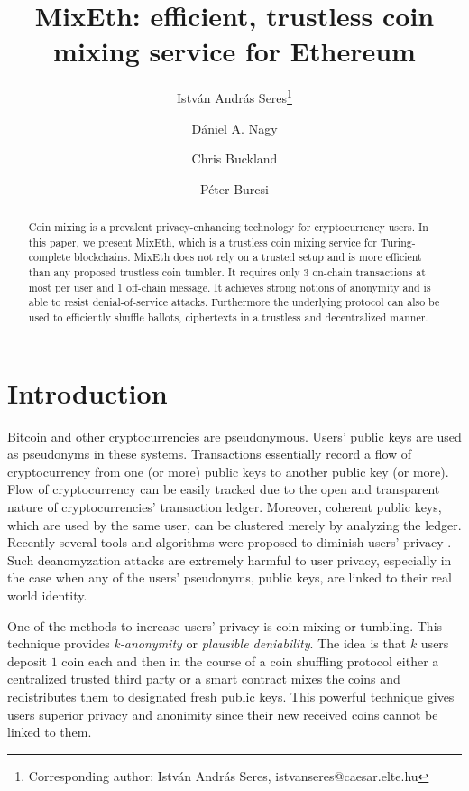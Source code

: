 \documentclass[a4paper,UKenglish,cleveref, autoref]{oasics-v2019}
\date{}
\title{MixEth: efficient, trustless coin mixing service for Ethereum} %
\author{István András Seres\footnote{Corresponding author: István András Seres, istvanseres@caesar.elte.hu}}{Eötvös Loránd University, Hungary \and \url{http://istvanseres.web.elte.hu/} }{istvanseres@caesar.elte.hu}{https://orcid.org/0000-0003-0143-4057}{}%
\author{Dániel A. Nagy}{Eötvös Loránd University, Hungary}{daniel@ethereum.org}{}{}
\author{Chris Buckland}{King's College London, United Kingdom}{cpbuckland88@gmail.com}{}{is supported by an Ethereum Foundation scaling grant and an Ethereum Community Fund grant.}
\author{Péter Burcsi}{Eötvös Loránd University, Hungary}{bupe@inf.elte.hu}{https://orcid.org/0000-0003-3306-6500}{}
\begin{document}
\maketitle

\begin{abstract}
Coin mixing is a prevalent privacy-enhancing technology for cryptocurrency users. In this paper, we present MixEth, which is a trustless coin mixing service for Turing-complete blockchains. MixEth does not rely on a trusted setup and is more efficient than any proposed trustless coin tumbler. It requires only 3 on-chain transactions at most per user and 1 off-chain message. It achieves strong notions of anonymity and is able to resist denial-of-service attacks. Furthermore the underlying protocol can also be used to efficiently shuffle ballots, ciphertexts in a trustless and decentralized manner. 
\end{abstract}

\section{Introduction}
Bitcoin \cite{nakamoto2008bitcoin} and other cryptocurrencies are pseudonymous. Users' public keys are used as pseudonyms in these systems. Transactions essentially record a flow of cryptocurrency from one (or more) public keys to another public key (or more). Flow of cryptocurrency can be easily tracked due to the open and transparent nature of cryptocurrencies' transaction ledger. Moreover, coherent public keys, which are used by the same user, can be clustered merely by analyzing the ledger. Recently several tools and algorithms were proposed to diminish users' privacy \cite{meiklejohn2013fistful,moser2013inquiry,moreno2016listening}. Such deanomyzation attacks are extremely harmful to user privacy, especially in the case when any of the users' pseudonyms, public keys, are linked to their real world identity.

One of the methods to increase users' privacy is coin mixing or tumbling. This technique provides \textit{k-anonymity} or \textit{plausible deniability}. The idea is that $k$ users deposit $1$ coin each and then in the course of a coin shuffling protocol either a centralized trusted third party or a smart contract mixes the coins and redistributes them to designated fresh public keys. This powerful technique gives users superior privacy and anonimity since their new received coins cannot be linked to them.
\end{document}
